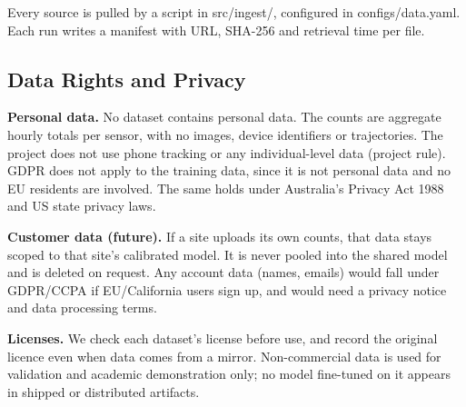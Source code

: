 \documentclass[11pt]{article}
\begin{document}
Every source is pulled by a script in src/ingest/, configured in configs/data.yaml. Each run writes a manifest with URL, SHA-256 and retrieval time per file.

\subsection{Data Rights and Privacy}

\textbf{Personal data.} No dataset contains personal data. The counts are aggregate hourly totals per sensor, with no images, device identifiers or trajectories. The project does not use phone tracking or any individual-level data (project rule). GDPR does not apply to the training data, since it is not personal data and no EU residents are involved. The same holds under Australia's Privacy Act 1988 and US state privacy laws.

\textbf{Customer data (future).} If a site uploads its own counts, that data stays scoped to that site's calibrated model. It is never pooled into the shared model and is deleted on request. Any account data (names, emails) would fall under GDPR/CCPA if EU/California users sign up, and would need a privacy notice and data processing terms.

\textbf{Licenses.} We check each dataset's license before use, and record the original licence even when data comes from a mirror. Non-commercial data is used for validation and academic demonstration only; no model fine-tuned on it appears in shipped or distributed artifacts.
\end{document}

